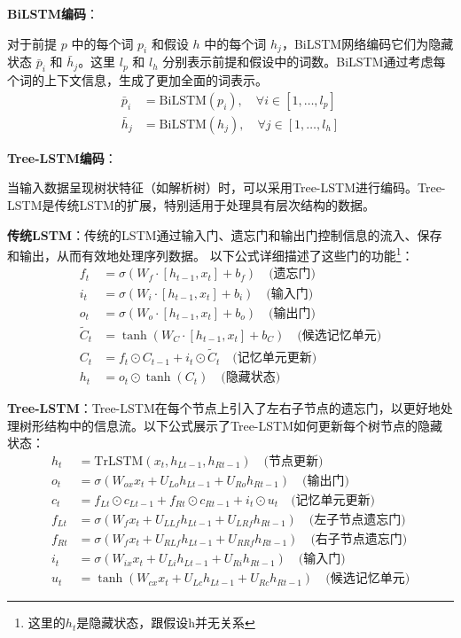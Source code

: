 \textbf{BiLSTM编码}：

对于前提 \( p \) 中的每个词 \( p_i \) 和假设 \( h \) 中的每个词 \( h_j \)，BiLSTM网络编码它们为隐藏状态 \( \bar{p}_i \) 和 \( \bar{h}_j \)。这里 \( l_p \) 和 \( l_h \) 分别表示前提和假设中的词数。BiLSTM通过考虑每个词的上下文信息，生成了更加全面的词表示。
\begin{align}
    \bar{p}_i &= \text{BiLSTM}(p_i), \quad \forall i \in [1, \ldots, l_p] \\
    \bar{h}_j &= \text{BiLSTM}(h_j), \quad \forall j \in [1, \ldots, l_h]
\end{align}

\textbf{Tree-LSTM编码}：

当输入数据呈现树状特征（如解析树）时，可以采用Tree-LSTM进行编码。Tree-LSTM是传统LSTM的扩展，特别适用于处理具有层次结构的数据。

\textbf{传统LSTM}：传统的LSTM通过输入门、遗忘门和输出门控制信息的流入、保存和输出，从而有效地处理序列数据。
以下公式详细描述了这些门的功能\footnote{这里的$h_t$是隐藏状态，跟假设h并无关系}：
\begin{align}
    f_t &= \sigma(W_f \cdot [h_{t-1}, x_t] + b_f) \quad \text{(遗忘门)} \\
    i_t &= \sigma(W_i \cdot [h_{t-1}, x_t] + b_i) \quad \text{(输入门)} \\
    o_t &= \sigma(W_o \cdot [h_{t-1}, x_t] + b_o) \quad \text{(输出门)} \\
    \tilde{C}_t &= \tanh(W_C \cdot [h_{t-1}, x_t] + b_C) \quad \text{(候选记忆单元)} \\
    C_t &= f_t \odot C_{t-1} + i_t \odot \tilde{C}_t \quad \text{(记忆单元更新)} \\
    h_t &= o_t \odot \tanh(C_t) \quad \text{(隐藏状态)}
\end{align}

\textbf{Tree-LSTM}：Tree-LSTM在每个节点上引入了左右子节点的遗忘门，以更好地处理树形结构中的信息流。以下公式展示了Tree-LSTM如何更新每个树节点的隐藏状态：
\begin{align}
    h_t &= \text{TrLSTM}(x_t, h_{Lt-1}, h_{Rt-1}) \quad \text{(节点更新)} \\
    o_t &= \sigma(W_{ox} x_t + U_{Lo} h_{Lt-1} + U_{Ro} h_{Rt-1}) \quad \text{(输出门)} \\
    c_t &= f_{Lt} \odot c_{Lt-1} + f_{Rt} \odot c_{Rt-1} + i_t \odot u_t \quad \text{(记忆单元更新)} \\
    f_{Lt} &= \sigma(W_{f} x_t + U_{LLf} h_{Lt-1} + U_{LRf} h_{Rt-1}) \quad \text{(左子节点遗忘门)} \\
    f_{Rt} &= \sigma(W_{f} x_t + U_{RLf} h_{Lt-1} + U_{RRf} h_{Rt-1}) \quad \text{(右子节点遗忘门)} \\
    i_t &= \sigma(W_{ix} x_t + U_{Li} h_{Lt-1} + U_{Ri} h_{Rt-1}) \quad \text{(输入门)} \\
    u_t &= \tanh(W_{cx} x_t + U_{Lc} h_{Lt-1} + U_{Rc} h_{Rt-1}) \quad \text{(候选记忆单元)}
\end{align}

